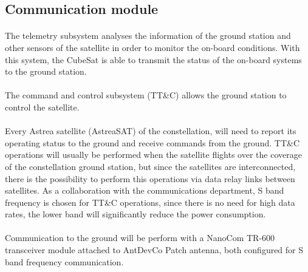 \subsection{Communication module}



\paragraph{} The telemetry subsystem analyses the information of the ground station and other sensors of the satellite in order to monitor the on-board conditions. With this system, the CubeSat is able to transmit the status of the on-board systems to the ground station.
\paragraph{}The command and control subsystem (TT\&C) allows the ground station to control the satellite.
\paragraph{} Every Astrea satellite (AstreaSAT) of the constellation, will need to report its operating status to the ground and receive commands from the ground. TT\&C operations will usually be performed when the satellite flights over the coverage of the constellation ground station, but since the satellites are interconnected, there is the possibility to perform this operations via data relay links between satellites. As a collaboration with the communications department, S band frequency is chosen for TT\&C operations, since there is no need for high data rates, the lower band will significantly reduce the power consumption.

\paragraph{}  Communication to the ground will be perform with a NanoCom TR-600 transceiver module attached to AntDevCo Patch antenna, both configured for S band frequency communication.


